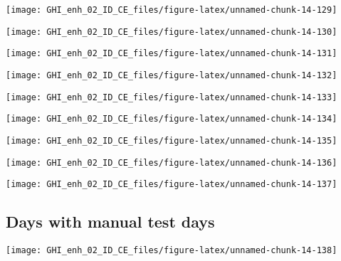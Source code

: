 \documentclass[
  10pt,
  a4paper,oneside]{article}
\begin{document}
\begin{center}\texttt{[image: GHI\_enh\_02\_ID\_CE\_files/figure-latex/unnamed-chunk-14-129]} \end{center}

\begin{center}\texttt{[image: GHI\_enh\_02\_ID\_CE\_files/figure-latex/unnamed-chunk-14-130]} \end{center}

\begin{center}\texttt{[image: GHI\_enh\_02\_ID\_CE\_files/figure-latex/unnamed-chunk-14-131]} \end{center}

\begin{center}\texttt{[image: GHI\_enh\_02\_ID\_CE\_files/figure-latex/unnamed-chunk-14-132]} \end{center}

\begin{center}\texttt{[image: GHI\_enh\_02\_ID\_CE\_files/figure-latex/unnamed-chunk-14-133]} \end{center}

\begin{center}\texttt{[image: GHI\_enh\_02\_ID\_CE\_files/figure-latex/unnamed-chunk-14-134]} \end{center}

\begin{center}\texttt{[image: GHI\_enh\_02\_ID\_CE\_files/figure-latex/unnamed-chunk-14-135]} \end{center}

\begin{center}\texttt{[image: GHI\_enh\_02\_ID\_CE\_files/figure-latex/unnamed-chunk-14-136]} \end{center}

\begin{center}\texttt{[image: GHI\_enh\_02\_ID\_CE\_files/figure-latex/unnamed-chunk-14-137]} \end{center}

\FloatBarrier

\hypertarget{days-with-manual-test-days}{%
\subsection{Days with manual test days}\label{days-with-manual-test-days}}

\begin{center}\texttt{[image: GHI\_enh\_02\_ID\_CE\_files/figure-latex/unnamed-chunk-14-138]} \end{center}
\end{document}
